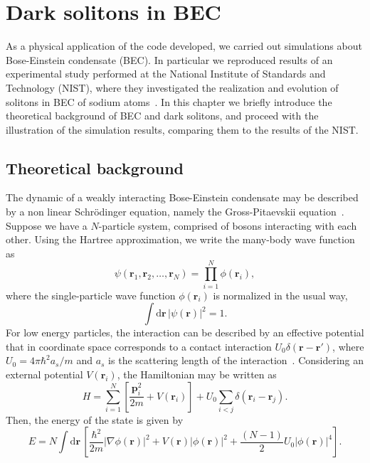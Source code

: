 \chapter{Dark solitons in BEC}
As a physical application of the code developed, we carried out simulations about Bose-Einstein condensate (BEC). In particular we reproduced results of an experimental study performed at the National Institute of Standards and Technology (NIST), where they investigated the realization and evolution of solitons in BEC of sodium atoms~\citep{DSF00}. In this chapter we briefly introduce the theoretical background of BEC and dark solitons, and proceed with the illustration of the simulation results, comparing them to the results of the NIST.

\section{Theoretical background}
The dynamic of a weakly interacting Bose-Einstein condensate may be described by a non linear Schr\"odinger equation, namely the Gross-Pitaevskii equation~\citep{RC97,JKP98,DCLZ98,ZPMW99,DGPS99}. Suppose we have a $N$-particle system, comprised of bosons interacting with each other. Using the Hartree approximation, we write the many-body wave function as
\begin{equation}
\psi(\textbf{r}_1, \textbf{r}_2,\ldots, \textbf{r}_N) = \prod_{i=1}^N \phi(\textbf{r}_i),
\end{equation}
where the single-particle wave function $\phi(\textbf{r}_i)$ is normalized in the usual way,
\begin{equation}
\int \mathrm{d}\textbf{r} \, |\psi(\textbf{r})|^2 = 1.
\end{equation} 
For low energy particles, the interaction can be described by an effective potential %
that in coordinate space corresponds to a contact interaction $U_0 \delta(\textbf{r} - \textbf{r}')$, where $U_0 = 4 \pi \hbar^2 a_s / m$ and $a_s$ is the scattering length of the interaction~\citep{pethick2002bose}. Considering an external potential $V(\textbf{r}_i)$, the Hamiltonian may be written as
\begin{equation}
H = \sum_{i=1}^N \left[ \frac{\textbf{p}_i^2}{2 m} + V(\textbf{r}_i) \right] + U_0 \sum_{i<j} \delta(\textbf{r}_i - \textbf{r}_j).
\end{equation}
Then, the energy of the state is given by
\begin{equation}
E =  N \int \mathrm{d} \textbf{r} \, \left[ \frac{\hbar^2}{2m} |\nabla \phi(\textbf{r}) |^2 + V(\textbf{r}) |\phi(\textbf{r})|^2 + \frac{(N-1)}{2} U_0 |\phi(\textbf{r})|^4 \right].
\end{equation} 
